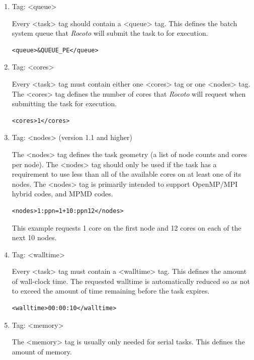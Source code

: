 \documentclass[11pt,fleqn]{report}              %
\begin{document}
\begin{enumerate}
\item Tag: <queue>

Every <task> tag should contain a <queue> tag. This defines the batch system queue that {\it Rocoto} will submit the task to for execution.

\lstset{language=XML}   
\begin{lstlisting}[frame=trBL]
<queue>&QUEUE_PE</queue>
\end{lstlisting}

\item Tag: <cores>

Every <task> tag must contain either one <cores> tag or one <nodes> tag. The <cores> tag defines the number of cores that {\it Rocoto} will request when submitting the task for execution.

\lstset{language=XML}   
\begin{lstlisting}[frame=trBL]
<cores>1</cores>
\end{lstlisting}

\item Tag: <nodes> (version 1.1 and higher)

The <nodes> tag defines the task geometry (a list of node counts and cores per node). The <nodes> tag should only be used if the task has a requirement to use less than all of the available cores on at least one of its nodes. The <nodes> tag is primarily intended to support OpenMP/MPI hybrid codes, and MPMD codes.

\lstset{language=XML}   
\begin{lstlisting}[frame=trBL]
<nodes>1:ppn=1+10:ppn12</nodes>
\end{lstlisting}
This example requests 1 core on the first node and 12 cores on each of the next 10 nodes.


\item Tag: <walltime>

Every <task> tag must contain a <walltime> tag. This defines the amount of wall-clock time. The requested walltime is automatically reduced so as not to exceed the amount of time remaining before the task expires.

\lstset{language=XML}   
\begin{lstlisting}[frame=trBL]
<walltime>00:00:10</walltime>
\end{lstlisting}


\item Tag: <memory>

The <memory> tag is usually only needed for serial tasks. This defines the amount of memory.


\end{enumerate}
\end{document}
